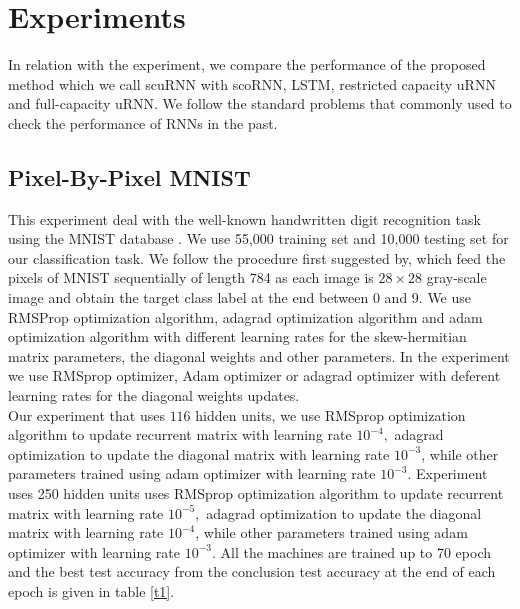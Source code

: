 \documentclass[letterpaper]{article} %
\begin{document}
\section{Experiments}
\noindent In relation with the experiment, we compare the performance of the proposed method which we call scuRNN  with scoRNN, LSTM, restricted capacity uRNN and full-capacity uRNN. We follow the standard problems that commonly used to check the performance of RNNs in the past.  

\subsection{Pixel-By-Pixel MNIST}
This experiment deal with the well-known handwritten digit recognition task using the MNIST database \cite{LeCun}. We use 55,000 training set and 10,000 testing set for our classification task. We follow the procedure first suggested by\cite{Le15}, which feed the pixels of MNIST sequentially of length 784 as each image is $28 \times 28$ gray-scale image and obtain the target class label at the end between 0 and 9. We use RMSProp optimization algorithm, adagrad optimization algorithm and adam optimization algorithm with different learning rates for the skew-hermitian matrix parameters, the diagonal weights and other parameters. In the experiment we use RMSprop optimizer, Adam optimizer or adagrad optimizer with deferent learning rates for the diagonal weights updates.\\

\noindent Our experiment that uses $116$ hidden units, we use RMSprop optimization algorithm to update recurrent matrix with learning rate $10^{-4},$ adagrad optimization to update the diagonal matrix with learning rate $10^{-3}$, while other parameters trained using adam optimizer with learning rate $10^{-3}.$ Experiment uses 250 hidden units uses RMSprop optimization algorithm to update recurrent matrix with learning rate $10^{-5},$ adagrad optimization to update the diagonal matrix with learning rate $10^{-4}$, while other parameters trained using adam optimizer with learning rate $10^{-3}.$ All the machines are trained up to 70 epoch and the best test accuracy from the conclusion test accuracy at the end of each epoch is given in table \ref{t1}.
\end{document}
